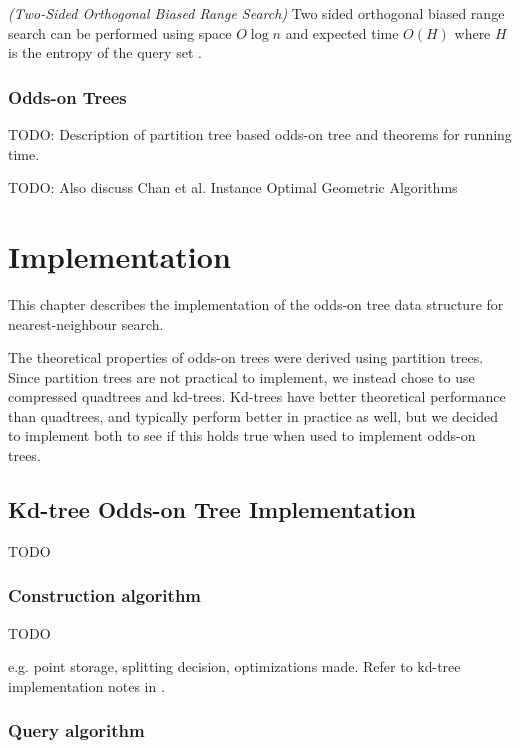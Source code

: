 \documentclass[mcs]{scsthesis}
\begin{document}
\begin{thm} \emph{(Two-Sided Orthogonal Biased Range Search)} 
Two sided orthogonal biased range search can be performed using space
\(O \log n\) and expected time \(O(H)\) where \(H\) is the entropy of the query
set \cite{biasedrange}.
\end{thm}

\subsection{Odds-on Trees}

TODO: Description of partition tree based odds-on tree and theorems for
running time.

TODO: Also discuss Chan et al. Instance Optimal Geometric Algorithms

\chapter{Implementation}

This chapter describes the implementation of the odds-on tree data structure
for nearest-neighbour search.

The theoretical properties of odds-on trees were derived using partition trees.
Since partition trees are not practical to implement, we instead chose to use
compressed quadtrees and kd-trees. Kd-trees have better theoretical performance
than quadtrees, and typically perform better in practice as well, but we
decided to implement both to see if this holds true when used to implement
odds-on trees.

\section{Kd-tree Odds-on Tree Implementation}

TODO

\subsection{Construction algorithm}

TODO

e.g. point storage, splitting decision, optimizations made. Refer to 
kd-tree implementation notes in \cite{physicallybasedrendering}.

\subsection{Query algorithm}
\end{document}
